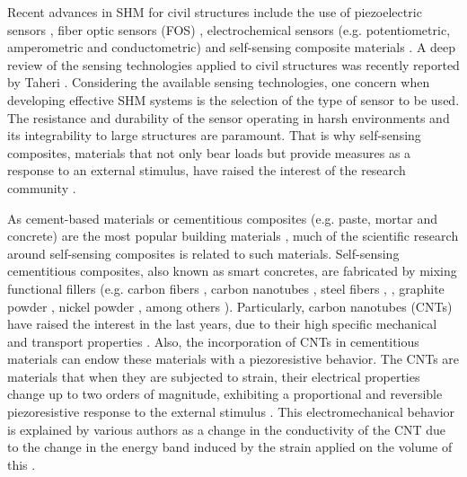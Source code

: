 \documentclass[twocolumn]{bmcart}%
\begin{document}
Recent advances in SHM for civil structures include the use of piezoelectric sensors \cite{Liao2019},  fiber optic sensors (FOS) \cite{Glisic2013, Barrias2019, Xu2019}, electrochemical sensors (e.g. potentiometric, amperometric and conductometric) \cite{Hu2011, Qiao2012} and self-sensing composite materials \cite{Tian2019a}. A deep review of the sensing technologies applied to civil structures was recently reported by Taheri \cite{Taheri2019a}. Considering the available sensing technologies, one concern when developing effective SHM systems is the selection of the type of sensor to be used. The resistance and durability of the sensor operating in harsh environments and its integrability to large structures are paramount. That is why self-sensing composites, materials that not only bear loads but provide measures as a response to an external stimulus, have raised the interest of the research community \cite{DAlessandro2016, Han2015a, Rana2016a, Yang2020a}.

As cement-based materials or cementitious composites (e.g. paste, mortar and concrete) are the most popular building materials \cite{Xu2017a}, much of the scientific research around self-sensing composites is related to such materials. Self-sensing cementitious composites, also known as smart concretes, are fabricated by mixing functional fillers (e.g. carbon fibers \cite{Baeza2013a,Teomete2015, Sarwary2019a}, carbon nanotubes \cite{Elkashef2015a}, steel fibers \cite{Kang2018b}, \cite{Ding2019}, graphite powder \cite{Simonova2018}, nickel powder \cite{Wang2015} , among others \cite{Tian2019a}). Particularly, carbon nanotubes (CNTs) have raised the interest in the last years, due to their high specific mechanical and transport properties \cite{Schumacher2014,Ubertini2016}. Also, the incorporation of CNTs in cementitious materials can endow these materials with a piezoresistive behavior. The CNTs are materials that when they are subjected to strain, their electrical properties change up to two orders of magnitude, exhibiting a proportional and reversible piezoresistive response to the external stimulus \cite{Garcia-Macias2017, Garcia-Macias2017a, Minot2003}. This electromechanical behavior is explained by various authors as a change in the conductivity of the CNT due to the change in the energy band induced by the strain applied on the volume of this \cite{Minot2003, PHAM2008, Han2015, Njuguna2012, Tjong2009, XinxinSun2009}. 
\end{document}
